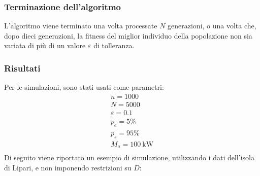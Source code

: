 \documentclass[fleqn,10pt]{SelfArx} %
\begin{document}
\subsubsection{Terminazione dell'algoritmo}
L'algoritmo viene terminato una volta processate \(N\) generazioni, o una volta che, dopo dieci generazioni, la fitness del miglior individuo della popolazione non sia variata di più di un valore \(\varepsilon\) di tolleranza.

\subsubsection{Risultati}
Per le simulazioni, sono stati usati come parametri:
\begin{equation*}
	\begin{array}{ll}
		n = 1000 \\
		N = 5000 \\
		\varepsilon = 0.1 \\
		p_e = 5\% \\
		p_s = 95\% \\
		M_a = \SI{100}{\kW} \\
	\end{array}
\end{equation*}
Di seguito viene riportato un esempio di simulazione, utilizzando i dati dell'isola di Lipari, e non imponendo restrizioni su \(D\):




\end{document}

